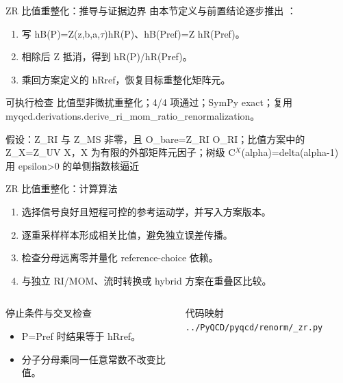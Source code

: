 \begin{frame}[t]{ZR 比值重整化：推导与证据边界}
\footnotesize
{}\quad 由本节定义与前置结论逐步推出 ：
\begin{enumerate}
\item 写 hB(P)=Z(z,b,a,\ensuremath{\tau})hR(P)、hB(Pref)=Z hR(Pref)。
\item 相除后 Z 抵消，得到 hR(P)/\allowbreak{}hR(Pref)。
\item 乘回方案定义的 hRref，恢复目标重整化矩阵元。
\end{enumerate}\begin{block}{可执行检查}
\quad 比值型非微扰重整化；4/4 项通过；SymPy exact；复用 myqcd.derivations.derive\_ri\_mom\_ratio\_renormalization。
\par\scriptsize 假设：Z\_RI 与 Z\_MS 非零，且 O\_bare=Z\_RI O\_RI；比值方案中的 Z\_X=Z\_UV X，X 为有限的外部矩阵元因子；树级 C\ensuremath{^{X}}(alpha)=delta(alpha-1) 用 epsilon>0 的单侧指数核逼近
\end{block}
\end{frame}

\begin{frame}[t]{ZR 比值重整化：计算算法}
\footnotesize
{}\begin{enumerate}
\item 选择信号良好且短程可控的参考运动学，并写入方案版本。
\item 逐重采样样本形成相关比值，避免独立误差传播。
\item 检查分母远离零并量化 reference-choice 依赖。
\item 与独立 RI/\allowbreak{}MOM、流时转换或 hybrid 方案在重叠区比较。
\end{enumerate}\begin{columns}[T,onlytextwidth]
\begin{block}{停止条件与交叉检查}\scriptsize\begin{itemize}
\item[\CheckMark] P=Pref 时结果等于 hRref。
\item[\CheckMark] 分子分母乘同一任意常数不改变比值。
\end{itemize}\end{block}
\begin{block}{代码映射}
\scriptsize \texttt{.\allowbreak{}.\allowbreak{}/\allowbreak{}PyQCD/\allowbreak{}pyqcd/\allowbreak{}renorm/\allowbreak{}\_\allowbreak{}zr.\allowbreak{}py}
\end{block}\end{columns}\end{frame}

